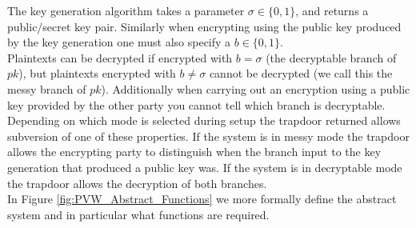 \documentclass[ %
                    author={Nicholas Tutte},
                supervisor={Prof. Nigel Smart},
                    degree={MEng},
                     title={Secure Two Party Computation},
                  subtitle={A practical comparison of recent protocols},
                      type={Research - GG1K},
                      year={2015} ]{dissertation}
\begin{document}
					The key generation algorithm takes a parameter $\sigma \in \{0, 1\}$, and returns a public/secret key pair. Similarly when encrypting using the public key produced by the key generation one must also specify a $b \in \{0, 1\}$.\\

					Plaintexts can be decrypted if encrypted with $b = \sigma$ (the decryptable branch of $pk$), but plaintexts encrypted with $b \neq \sigma$ cannot be decrypted (we call this the messy branch of $pk$). Additionally when carrying out an encryption using a public key provided by the other party you cannot tell which branch is decryptable.\\

					Depending on which mode is selected during setup the trapdoor returned allows subversion of one of these properties. If the system is in messy mode the trapdoor allows the encrypting party to distinguish when the branch input to the key generation that produced a public key was. If the system is in decryptable mode the trapdoor allows the decryption of both branches.\\

					In Figure \ref{fig:PVW_Abstract_Functions} we more formally define the abstract system and in particular what functions are required.
\end{document}

